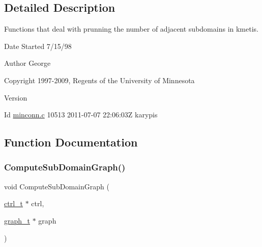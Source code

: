 \subsection{Detailed Description}
Functions that deal with prunning the number of adjacent subdomains in kmetis. 

\begin{DoxyDate}{Date}
Started 7/15/98 
\end{DoxyDate}
\begin{DoxyAuthor}{Author}
George 

Copyright 1997-\/2009, Regents of the University of Minnesota 
\end{DoxyAuthor}
\begin{DoxyVersion}{Version}

\end{DoxyVersion}
\begin{DoxyParagraph}{Id}
\hyperlink{a00242}{minconn.\+c} 10513 2011-\/07-\/07 22\+:06\+:03Z karypis 
\end{DoxyParagraph}


\subsection{Function Documentation}
\mbox{\label{a00242_a78c50bcdffefbd90914a77c4add573cc}} 
\subsubsection{\texorpdfstring{Compute\+Sub\+Domain\+Graph()}{ComputeSubDomainGraph()}}
{\footnotesize\ttfamily void Compute\+Sub\+Domain\+Graph (\begin{DoxyParamCaption}\item[{\hyperlink{a00742}{ctrl\+\_\+t} $\ast$}]{ctrl,  }\item[{\hyperlink{a00734}{graph\+\_\+t} $\ast$}]{graph }\end{DoxyParamCaption})}


